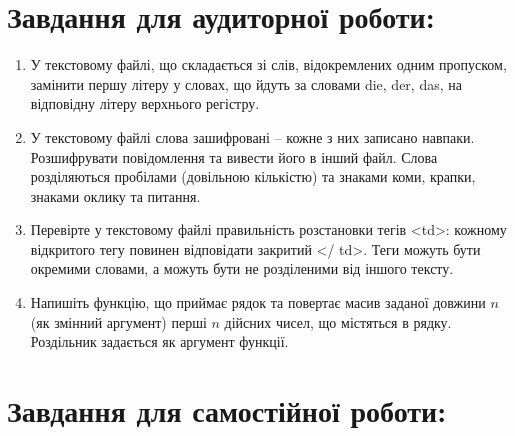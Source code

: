 \documentclass[a5paper,titlepage,openany,twoside,
]
{book_unv}%
\begin{document}
\section{Завдання для аудиторної роботи:}

\begin{enumerate}
\def\labelenumi{\arabic{enumi})}
\item
  У текстовому файлі, що складається зі слів, відокремлених одним пропуском,
  замінити першу літеру у словах, що йдуть за словами die, der, das, на
  відповідну літеру верхнього регістру.
\item
  У текстовому файлі слова зашифровані -- кожне з них записано навпаки.
  Розшифрувати повідомлення та вивести його в інший файл. 
 Слова розділяються пробілами (довільною кількістю)
  та знаками коми, крапки, знаками оклику та питання. 
\item
 Перевірте у текстовому файлі правильність
  розстановки тегів \textless{}td\textgreater{}: кожному відкритого тегу
  повинен відповідати закритий \textless{}/ td\textgreater{}. Теги можуть бути
окремими словами, а можуть бути  не розділеними від іншого тексту.

\item
  Напишіть функцію, що приймає рядок та повертає масив заданої довжини $n$ (як
  змінний аргумент) перші $n$ дійсних чисел, що містяться в рядку. Роздільник
  задається як аргумент функції.
\end{enumerate}

\section{Завдання для самостійної роботи:}
\end{document}
